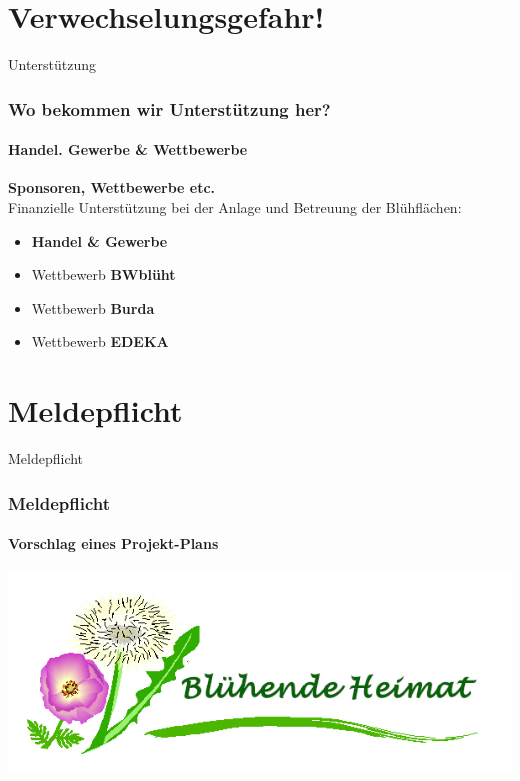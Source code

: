 \documentclass[aspectratio=169]{beamer}
\begin{document}
\section[Heimische Insekten]{Verwechselungsgefahr!}


\begin{frame}{Unterstützung}
\frametitle{Wo bekommen wir Unterstützung her?} 
\framesubtitle{Handel. Gewerbe \& Wettbewerbe}

\textbf{Sponsoren, Wettbewerbe etc.}\\
Finanzielle Unterstützung bei der Anlage und Betreuung der Blühflächen:

\begin{itemize}
	\item 
	\textbf{Handel \& Gewerbe} \pause 
	\item
	Wettbewerb \textbf{BWblüht} \pause
	\item 
	Wettbewerb \textbf{Burda} \pause
	\item 
	Wettbewerb \textbf{EDEKA}%

\end{itemize}
\end{frame}




\section{Meldepflicht}

\begin{frame}{Meldepflicht}
\frametitle{Meldepflicht} 
\framesubtitle{Vorschlag eines Projekt-Plans}

\begin{center}
	
	\includegraphics[width=1.0\textwidth]{figures/BH-Logo.png}
	
\end{center}

\end{frame}
\end{document}
